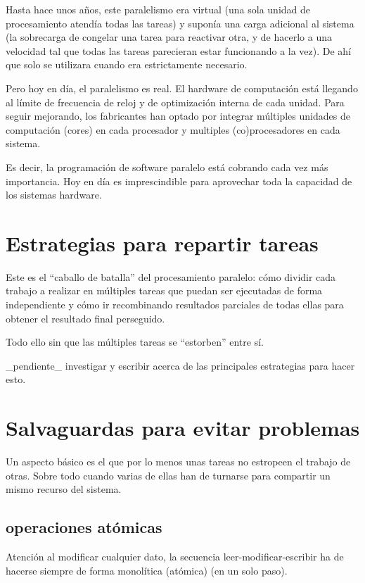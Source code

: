 \documentclass[spanish,12pt,a4paper,final,oneside]{book}
\begin{document}
Hasta hace unos años, este paralelismo era virtual (una sola unidad de procesamiento atendía todas las tareas) y suponía una carga adicional al sistema (la sobrecarga de congelar una tarea para reactivar otra, y de hacerlo a una velocidad tal que todas las tareas parecieran estar funcionando a la vez). De ahí que solo se utilizara cuando era estrictamente necesario.

Pero hoy en día, el paralelismo es real. El hardware de computación está llegando al límite de frecuencia de reloj y de optimización interna de cada unidad. Para seguir mejorando, los fabricantes han optado por integrar múltiples unidades de computación (cores) en cada procesador y multiples (co)procesadores en cada sistema.

Es decir, la programación de software paralelo está cobrando cada vez más importancia. Hoy en día es imprescindible para aprovechar toda la capacidad de los sistemas hardware.



\section{Estrategias para repartir tareas}
Este es el ``caballo de batalla'' del procesamiento paralelo: cómo dividir cada trabajo a realizar en múltiples tareas que puedan ser ejecutadas de forma independiente y cómo ir recombinando resultados parciales de todas ellas para obtener el resultado final perseguido.

Todo ello sin que las múltiples tareas se ``estorben'' entre sí.

\_pendiente\_ investigar y escribir acerca de las principales estrategias para hacer esto.


\section{Salvaguardas para evitar problemas}

Un aspecto básico es el que por lo menos unas tareas no estropeen el trabajo de otras. Sobre todo cuando varias de ellas han de turnarse para compartir un mismo recurso del sistema.

\subsection{operaciones atómicas}
Atención al modificar cualquier dato, la secuencia leer-modificar-escribir ha de hacerse siempre de forma monolítica (atómica) (en un solo paso).
\end{document}
